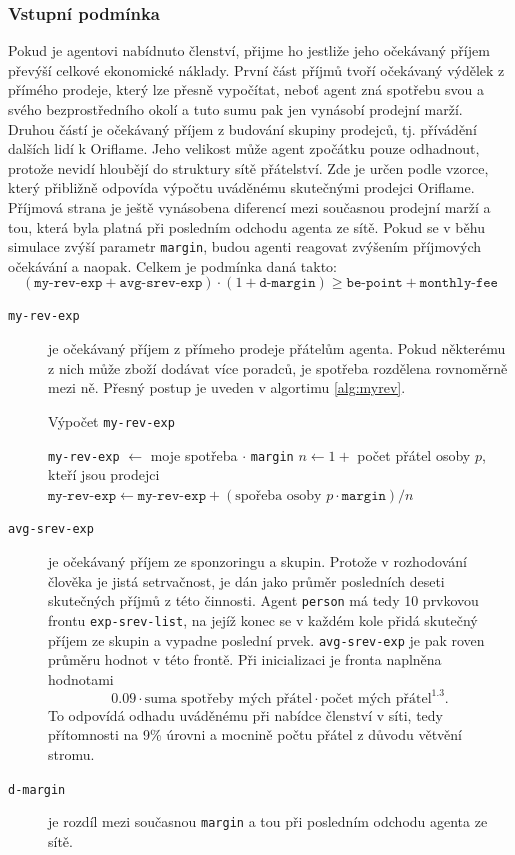 \documentclass[a4wide,12pt]{report}
\begin{document}
\subsubsection{Vstupní podmínka}
Pokud je agentovi nabídnuto členství, přijme ho jestliže jeho očekávaný příjem převýší celkové ekonomické náklady. První část příjmů tvoří očekávaný výdělek z přímého prodeje, který lze přesně vypočítat, neboť agent zná spotřebu svou a svého bezprostředního okolí a tuto sumu pak jen vynásobí prodejní marží. Druhou částí je očekávaný příjem z budování skupiny prodejců, tj. přívádění dalších lidí k Oriflame. Jeho velikost může agent zpočátku pouze odhadnout, protože nevidí hloubějí do struktury sítě přátelství. Zde je určen podle vzorce, který přibližně odpovída výpočtu uváděnému skutečnými prodejci Oriflame. Příjmová strana je ještě vynásobena diferencí mezi současnou prodejní marží a tou, která byla platná při posledním odchodu agenta ze sítě. Pokud se v běhu simulace zvýší parametr \texttt{margin}, budou agenti reagovat zvýšením příjmových očekávání a naopak. Celkem je podmínka daná takto:
\[(\texttt{my-rev-exp} + \texttt{avg-srev-exp}) \cdot (1+\texttt{d-margin}) \geq \texttt{be-point} + \texttt{monthly-fee}\]
\begin{description}
\item[\texttt{my-rev-exp}] je očekávaný příjem z přímeho prodeje přátelům agenta. Pokud některému z nich může zboží dodávat více poradců, je spotřeba rozdělena rovnoměrně mezi ně. Přesný postup je uveden v algortimu \ref{alg:myrev}.
\begin{algorithm}
\caption{Výpočet \texttt{my-rev-exp}}
\label{alg:myrev}
\begin{algorithmic}[]
\STATE \texttt{my-rev-exp} $\gets$ moje spotřeba $\cdot$ \texttt{margin}
  \STATE $n\gets 1 + $ počet přátel osoby $p$, kteří jsou prodejci
  \STATE $\texttt{my-rev-exp}\gets\texttt{my-rev-exp}+(\text{spořeba osoby }p \cdot \texttt{margin}) / n$
\ENDFOR
\end{algorithmic}
\end{algorithm}
\item[\texttt{avg-srev-exp}] je očekávaný příjem ze sponzoringu a skupin. Protože v rozhodování člověka je jistá setrvačnost, je dán jako průměr posledních deseti skutečných příjmů z této činnosti. Agent \texttt{person} má tedy 10 prvkovou frontu \texttt{exp-srev-list}, na jejíž konec se v každém kole přidá skutečný příjem ze skupin a vypadne poslední prvek. \texttt{avg-srev-exp} je pak roven průměru hodnot v této frontě. Při inicializaci je fronta naplněna hodnotami
\[ 0.09\cdot \text{suma spotřeby mých přátel}\cdot \text{počet mých přátel}^{1.3}.\]
To odpovídá odhadu uváděnému při nabídce členství v síti, tedy přítomnosti na 9\% úrovni a mocnině počtu přátel z důvodu větvění stromu.
\item[\texttt{d-margin}] je rozdíl mezi současnou \texttt{margin} a tou při posledním odchodu agenta ze sítě.
\end{description}
\end{document}
